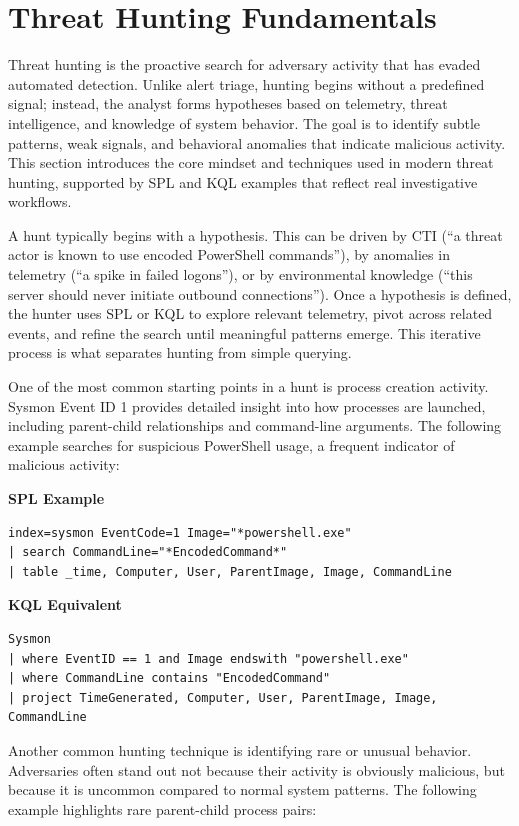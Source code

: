 \section{Threat Hunting Fundamentals}

Threat hunting is the proactive search for adversary activity that has evaded automated detection. Unlike alert triage, hunting begins without a predefined signal; instead, the analyst forms hypotheses based on telemetry, threat intelligence, and knowledge of system behavior. The goal is to identify subtle patterns, weak signals, and behavioral anomalies that indicate malicious activity. This section introduces the core mindset and techniques used in modern threat hunting, supported by SPL and KQL examples that reflect real investigative workflows.

A hunt typically begins with a hypothesis. This can be driven by CTI (“a threat actor is known to use encoded PowerShell commands”), by anomalies in telemetry (“a spike in failed logons”), or by environmental knowledge (“this server should never initiate outbound connections”). Once a hypothesis is defined, the hunter uses SPL or KQL to explore relevant telemetry, pivot across related events, and refine the search until meaningful patterns emerge. This iterative process is what separates hunting from simple querying.

One of the most common starting points in a hunt is process creation activity. Sysmon Event ID 1 provides detailed insight into how processes are launched, including parent-child relationships and command-line arguments. The following example searches for suspicious PowerShell usage, a frequent indicator of malicious activity:

\textbf{SPL Example}
\begin{lstlisting}
index=sysmon EventCode=1 Image="*powershell.exe"
| search CommandLine="*EncodedCommand*"
| table _time, Computer, User, ParentImage, Image, CommandLine
\end{lstlisting}

\textbf{KQL Equivalent}
\begin{lstlisting}
Sysmon
| where EventID == 1 and Image endswith "powershell.exe"
| where CommandLine contains "EncodedCommand"
| project TimeGenerated, Computer, User, ParentImage, Image, CommandLine
\end{lstlisting}

Another common hunting technique is identifying rare or unusual behavior. Adversaries often stand out not because their activity is obviously malicious, but because it is uncommon compared to normal system patterns. The following example highlights rare parent-child process pairs:

